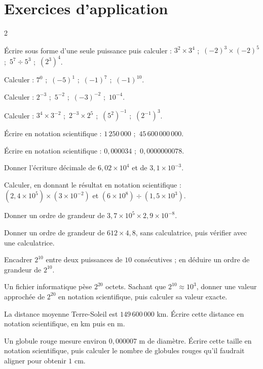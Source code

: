 \section{Exercices d'application}
\begin{multicols}{2}

\exo{} Écrire sous forme d'une seule puissance puis calculer : $3^{2}\times3^{4}$ ;\
$(-2)^{3}\times(-2)^{5}$ ;\ $5^{7}\div5^{3}$ ;\ $\left(2^{3}\right)^{4}$.

\exo{} Calculer : $7^{0}$ ;\ $(-5)^{1}$ ;\ $(-1)^{7}$ ;\ $(-1)^{10}$.

\exo{} Calculer : $2^{-3}$ ;\ $5^{-2}$ ;\ $(-3)^{-2}$ ;\ $10^{-4}$.

\exo{} Calculer : $3^{4}\times3^{-2}$ ;\ $2^{-3}\times2^{5}$ ;\ $\left(5^{2}\right)^{-1}$ ;\ $\left(2^{-1}\right)^{3}$.

\exo{} Écrire en notation scientifique : $1\,250\,000$ ;\ $45\,600\,000\,000$.

\exo{} Écrire en notation scientifique : $0{,}000034$ ;\ $0{,}0000000078$.

\exo{} Donner l'écriture décimale de $6{,}02\times10^{4}$ et de $3{,}1\times10^{-3}$.

\exo{} Calculer, en donnant le résultat en notation scientifique :
$(2{,}4\times10^{5})\times(3\times10^{-2})$ et $(6\times10^{8})\div(1{,}5\times10^{3})$.

\exo{} Donner un ordre de grandeur de $3{,}7\times10^{5}\times2{,}9\times10^{-8}$.

\exo{} Donner un ordre de grandeur de $612\times4{,}8$, sans calculatrice, puis
vérifier avec une calculatrice.

\exo{} Encadrer $2^{10}$ entre deux puissances de $10$ consécutives ; en déduire un
ordre de grandeur de $2^{10}$.

\exo{} Un fichier informatique pèse $2^{20}$ octets. Sachant que $2^{10}\approx10^{3}$,
donner une valeur approchée de $2^{20}$ en notation scientifique, puis calculer sa valeur
exacte.

\exo{} La distance moyenne Terre-Soleil est $149\,600\,000$ km. Écrire cette distance
en notation scientifique, en km puis en m.

\exo{} Un globule rouge mesure environ $0{,}000007$ m de diamètre. Écrire cette taille
en notation scientifique, puis calculer le nombre de globules rouges qu'il faudrait aligner
pour obtenir $1$ cm.


\end{multicols}
